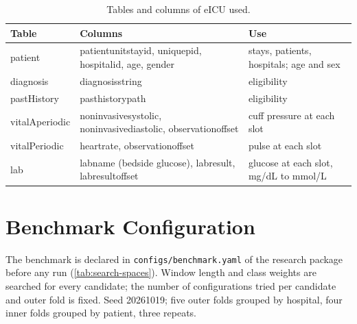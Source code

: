 \begin{table}[htbp]
\centering\footnotesize
\caption{Tables and columns of eICU used.}\label{tab:dict-eicu}
\begin{tabularx}{\textwidth}{@{}>{\ttfamily\raggedright\arraybackslash}p{2.6cm} >{\ttfamily\raggedright\arraybackslash}X >{\raggedright\arraybackslash}p{4.6cm}@{}}
\toprule
\normalfont\textbf{Table} & \normalfont\textbf{Columns} & \textbf{Use} \\
\midrule
patient & patientunitstayid, uniquepid, hospitalid, age, gender & stays, patients, hospitals; age and sex \\
diagnosis & diagnosisstring & eligibility \\
pastHistory & pasthistorypath & eligibility \\
vitalAperiodic & noninvasivesystolic, noninvasivediastolic, observationoffset & cuff pressure at each slot \\
vitalPeriodic & heartrate, observationoffset & pulse at each slot \\
lab & labname (bedside glucose), labresult, labresultoffset & glucose at each slot, mg/dL to mmol/L \\
\bottomrule
\end{tabularx}
\end{table}

\chapter{Benchmark Configuration}\label{app:config}

The benchmark is declared in \texttt{configs/benchmark.yaml} of the research package before any run (\cref{tab:search-spaces}). Window length and class weights are searched for every candidate; the number of configurations tried per candidate and outer fold is fixed. Seed 20261019; five outer folds grouped by hospital, four inner folds grouped by patient, three repeats.

